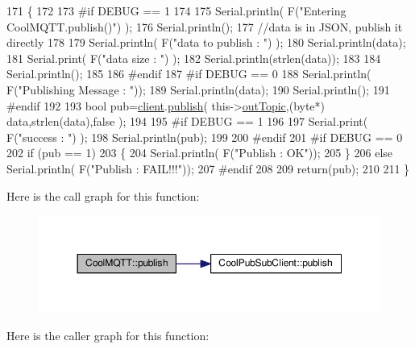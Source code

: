 \begin{DoxyCode}
171 \{
172 
173 \textcolor{preprocessor}{#if DEBUG == 1 }
174 
175     Serial.println( F(\textcolor{stringliteral}{"Entering CoolMQTT.publish()"}) );
176     Serial.println();
177     \textcolor{comment}{//data is in JSON, publish it directly}
178 
179     Serial.println( F(\textcolor{stringliteral}{"data to publish : "}) );
180     Serial.println(data);
181     Serial.print( F(\textcolor{stringliteral}{"data size : "}) );
182     Serial.println(strlen(data));
183 
184     Serial.println();
185 
186 \textcolor{preprocessor}{#endif}
187 \textcolor{preprocessor}{#if DEBUG == 0}
188     Serial.println( F(\textcolor{stringliteral}{"Publishing Message : "}));
189     Serial.println(data);
190     Serial.println();
191 \textcolor{preprocessor}{#endif}
192 
193     \textcolor{keywordtype}{bool} pub=\hyperlink{class_cool_m_q_t_t_afed1372683c44893b4668d0f1771f514}{client}.\hyperlink{class_cool_pub_sub_client_ab6ad5fa2d3db8f91454027257f225a89}{publish}( this->\hyperlink{class_cool_m_q_t_t_a109c786a17b463f9eeba046194279522}{outTopic},(byte*) data,strlen(data),\textcolor{keyword}{false}  );
194 
195 \textcolor{preprocessor}{#if DEBUG == 1 }
196 
197     Serial.print( F(\textcolor{stringliteral}{"success : "}) );
198     Serial.println(pub);    
199 
200 \textcolor{preprocessor}{#endif}
201 \textcolor{preprocessor}{#if DEBUG == 0}
202     \textcolor{keywordflow}{if} (pub == 1)
203     \{
204         Serial.println( F(\textcolor{stringliteral}{"Publish : OK"}));
205     \}
206     \textcolor{keywordflow}{else} Serial.println( F(\textcolor{stringliteral}{"Publish : FAIL!!!"}));
207 \textcolor{preprocessor}{#endif}
208 
209     \textcolor{keywordflow}{return}(pub);
210 
211 \}
\end{DoxyCode}
Here is the call graph for this function\+:\nopagebreak
\begin{figure}[H]
\begin{center}
\leavevmode
\includegraphics[width=350pt]{d0/dd0/class_cool_m_q_t_t_ace977b3e90ab14b1199fe5c4fb0a13ec_cgraph}
\end{center}
\end{figure}
Here is the caller graph for this function\+:\nopagebreak

